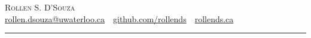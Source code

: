 \documentclass[oneside, 10pt]{memoir}
\begin{document}
\newcommand{\entryGeneral}[4]{
    \filbreak
    \textbf{#2} \sourceatright{#1}
    \emph{#3}
    \begin{adjustwidth}{1em}{0em}
        #4
    \end{adjustwidth}
    \hfill
}

\newcommand{\entrySimple}[3]{
    \filbreak
    \textbf{#2} \sourceatright{#1}
    \begin{adjustwidth}{1em}{0em}
        #3
    \end{adjustwidth}
    \hfill
}

%

\LARGE{\textsc{Rollen S. D'Souza}}\\
\small{\url{rollen.dsouza@uwaterloo.ca}~\textbullet~\url{github.com/rollends}~\textbullet~\url{rollends.ca} }\\
\rule{\linewidth}{0.4pt}
\end{document}
